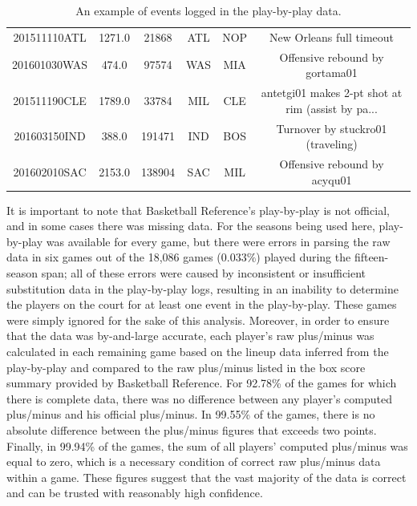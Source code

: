 \begin{table}
{\begin{tabular}{cccccc}
 201511110ATL &        1271.0 &    21868 &      ATL &      NOP & New Orleans full timeout \\
 201601030WAS &         474.0 &    97574 &      WAS &      MIA &                     Offensive rebound by gortama01 \\
 201511190CLE &        1789.0 &    33784 &      MIL &      CLE &  antetgi01 makes 2-pt shot at rim (assist by pa... \\
 201603150IND &         388.0 &   191471 &      IND &      BOS &                  Turnover by stuckro01 (traveling) \\
 201602010SAC &        2153.0 &   138904 &      SAC &      MIL &                       Offensive rebound by acyqu01 \\
\bottomrule
\end{tabular}
    }
    \caption{An example of events logged in the play-by-play data.}
    \label{tab:pbp}
\end{table}

It is important to note that Basketball Reference's play-by-play is not official,
and in some cases there was missing data. For the seasons being used here,
play-by-play was available for every game, but there were errors in parsing the raw
data in six games out of the 18,086 games ($0.033\%$) played during the
fifteen-season span; all of these errors were caused by inconsistent or insufficient
substitution data in the play-by-play logs, resulting in an inability to determine
the players on the court for at least one event in the play-by-play. These games
were simply ignored for the sake of this analysis. Moreover, in order to ensure that
the data was by-and-large accurate, each player's raw plus/minus was calculated in
each remaining game based on the lineup data inferred from the play-by-play and
compared to the raw plus/minus listed in the box score summary provided by
Basketball Reference. For 92.78\% of the games for which there is complete data,
there was no difference between any player's computed plus/minus and his official
plus/minus. In 99.55\% of the games, there is no absolute difference between the
plus/minus figures that exceeds two points. Finally, in 99.94\% of the games, the
sum of all players' computed plus/minus was equal to zero, which is a necessary
condition of correct raw plus/minus data within a game. These figures suggest that
the vast majority of the data is correct and can be trusted with reasonably high
confidence.


